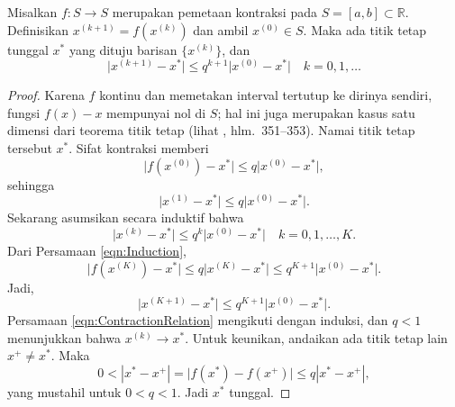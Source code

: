 \begin{lemma} Misalkan $f:S\rightarrow S$ merupakan pemetaan kontraksi pada $S=[a,b]\subset\mathbb{R}$. Definisikan $x^{(k+1)}=f(x^{(k)})$ dan ambil $x^{(0)}\in S$. Maka ada titik tetap tunggal $x^*$ yang dituju barisan $\{x^{(k)}\}$, dan
\begin{equation}
\lvert x^{(k+1)}-x^*\rvert\leq q^{k+1}\lvert x^{(0)}-x^*\rvert\quad k=0,1,\dots
\label{eqn:ContractionRelation}
\end{equation}
\end{lemma}
\begin{proof} Karena $f$ kontinu dan memetakan interval tertutup ke dirinya sendiri, fungsi $f(x)-x$ mempunyai nol di $S$; hal ini juga merupakan kasus satu dimensi dari teorema titik tetap (lihat \cite{Munk00}, hlm.~351--353). Namai titik tetap tersebut $x^*$. Sifat kontraksi memberi
\begin{equation}
\lvert f(x^{(0)})-x^*\rvert\leq q\lvert x^{(0)}-x^*\rvert,
\end{equation}
sehingga
\begin{equation}
\lvert x^{(1)}-x^*\rvert\leq q\lvert x^{(0)}-x^*\rvert.
\end{equation}
Sekarang asumsikan secara induktif bahwa
\begin{equation}
\lvert x^{(k)}-x^*\rvert\leq q^k\lvert x^{(0)}-x^*\rvert\quad k=0,1,\dots,K.
\label{eqn:Induction}
\end{equation}
Dari Persamaan \ref{eqn:Induction},
\begin{equation}
\lvert f(x^{(K)})-x^*\rvert\leq q\lvert x^{(K)}-x^*\rvert\leq q^{K+1}\lvert x^{(0)}-x^*\rvert.
\end{equation}
Jadi,
\begin{equation}
\lvert x^{(K+1)}-x^*\rvert\leq q^{K+1}\lvert x^{(0)}-x^*\rvert.
\end{equation}
Persamaan \ref{eqn:ContractionRelation} mengikuti dengan induksi, dan $q<1$ menunjukkan bahwa $x^{(k)}\to x^*$. Untuk keunikan, andaikan ada titik tetap lain $x^+\neq x^*$. Maka
\begin{equation}
0<|x^*-x^+|=\lvert f(x^*)-f(x^+)\rvert\leq q|x^*-x^+|,
\end{equation}
yang mustahil untuk $0<q<1$. Jadi $x^*$ tunggal.
\end{proof}


